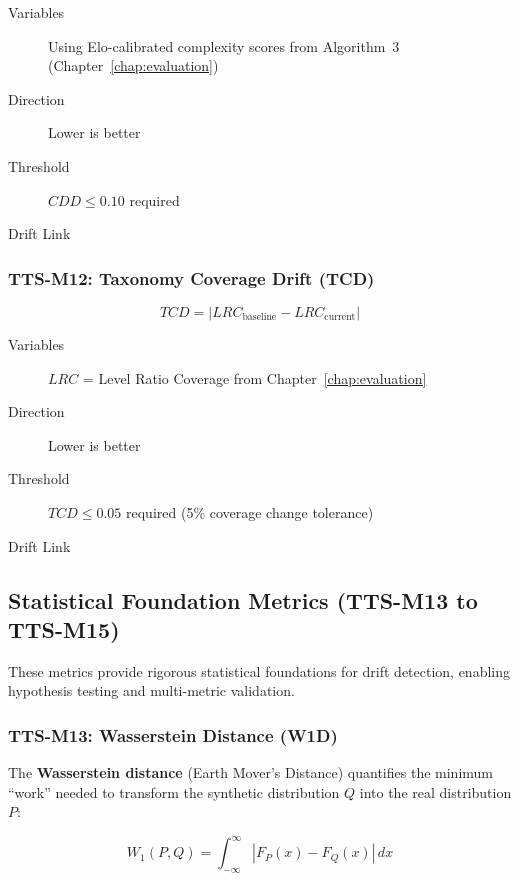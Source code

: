 \begin{description}
  \item[Variables] Using Elo-calibrated complexity scores from Algorithm~3
        (Chapter~\ref{chap:evaluation})
  \item[Direction] Lower is better
  \item[Threshold] $CDD \leq 0.10$ required
  \item[Drift Link] 
\end{description}

\subsubsection{TTS-M12: Taxonomy Coverage Drift (TCD)}

\begin{equation}
\boxed{
TCD = |LRC_{\text{baseline}} - LRC_{\text{current}}|
}
\end{equation}

\begin{description}
  \item[Variables] $LRC$ = Level Ratio Coverage from Chapter~\ref{chap:evaluation}
  \item[Direction] Lower is better
  \item[Threshold] $TCD \leq 0.05$ required (5\% coverage change tolerance)
  \item[Drift Link] 
\end{description}

\subsection{Statistical Foundation Metrics (TTS-M13 to TTS-M15)}

These metrics provide rigorous statistical foundations for drift detection,
enabling hypothesis testing and multi-metric validation.

\subsubsection{TTS-M13: Wasserstein Distance (W1D)}

The \textbf{Wasserstein distance} (Earth Mover's Distance) quantifies the
minimum ``work'' needed to transform the synthetic distribution $Q$ into
the real distribution $P$:

\begin{equation}
\boxed{
W_1(P, Q) = \int_{-\infty}^{\infty} |F_P(x) - F_Q(x)| \, dx
}
\end{equation}

